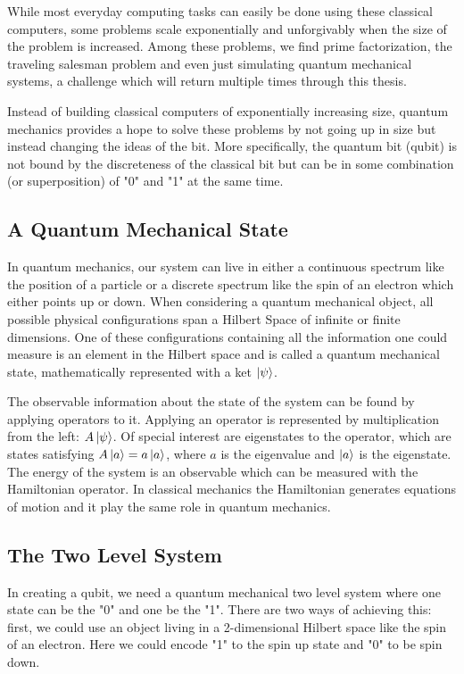 While most everyday computing tasks can easily be done using these classical computers, some problems scale exponentially and unforgivably when the size of the problem is increased. Among these problems, we find prime factorization, the traveling salesman problem and even just simulating quantum mechanical systems, a challenge which will return multiple times through this thesis.

Instead of building classical computers of exponentially increasing size, quantum mechanics provides a hope to solve these problems by not going up in size but instead changing the ideas of the bit. More specifically, the quantum bit (qubit) is not bound by the discreteness of the classical bit but can be in some combination (or superposition) of "0" and "1" at the same time. 

\subsection{A Quantum Mechanical State}
In quantum mechanics, our system can live in either a continuous spectrum like the position of a particle or a discrete spectrum like the spin of an electron which either points up or down. When considering a quantum mechanical object, all possible physical configurations span a Hilbert Space of infinite or finite dimensions. One of these configurations containing all the information one could measure is an element in the Hilbert space and is called a quantum mechanical state, mathematically represented with a ket $\ket{\psi}$. \cite{sakurai_modern_2021}

The observable information about the state of the system can be found by applying operators to it. Applying an operator is represented by multiplication from the left: $A\ket{\psi}$. Of special interest are eigenstates to the operator, which are states satisfying $A\ket{a} = a \ket{a}$, where $a$ is the eigenvalue and $\ket{a}$ is the eigenstate. The energy of the system is an observable which can be measured with the Hamiltonian operator. In classical mechanics the Hamiltonian generates equations of motion and it play the same role in quantum mechanics. \cite{sakurai_modern_2021}

\subsection{The Two Level System}\label{sec:tls}
In creating a qubit, we need a quantum mechanical two level system where one state can be the "0" and one be the "1". There are two ways of achieving this: first, we could use an object living in a 2-dimensional Hilbert space like the spin of an electron. Here we could encode "1" to the spin up state and "0" to be spin down. 

